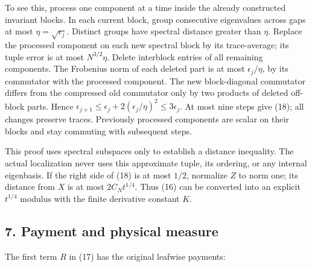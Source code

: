 To see this, process one component at a time inside the already
constructed invariant blocks. In each current block, group consecutive
eigenvalues across gaps at most \(\eta =\sqrt{\epsilon _{j}}\). Distinct
groups have spectral distance greater than \(\eta\). Replace the
processed component on each new spectral block by its trace-average; its
tuple error is at most \(N^{3/2} \eta\). Delete interblock entries of
all remaining components. The Frobenius norm of each deleted part is at
most \(\epsilon _{j}/\eta\), by its commutator with the processed
component. The new block-diagonal commutator differs from the compressed
old commutator only by two products of deleted off-block parts. Hence
\(\epsilon _{j+1}\le \epsilon _{j}+2(\epsilon _{j}/\eta )^{2}\le 3\epsilon _{j}\).
At most nine steps give (18); all changes preserve traces. Previously
processed components are scalar on their blocks and stay commuting with
subsequent steps.

This proof uses spectral subspaces only to establish a distance
inequality. The actual localization never uses this approximate tuple,
its ordering, or any internal eigenbasis. If the right side of (18) is
at most \(1/2\), normalize \(Z\) to norm one; its distance from \(X\) is
at most \(2C_{N} t^{1/4}\). Thus (16) can be converted into an explicit
\(t^{1/4}\) modulus with the finite derivative constant \(K\).

\subsection{7. Payment and physical
measure}\label{j-payment-and-physical-measure}

The first term \(R\) in (17) has the original leafwise payments:

